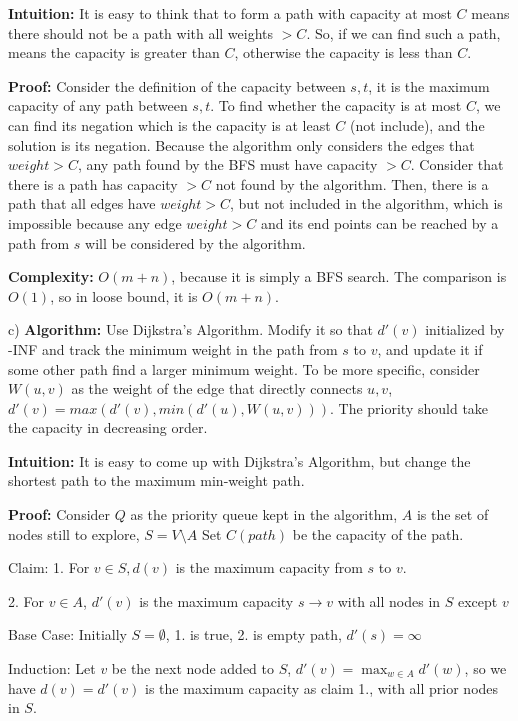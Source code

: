 \documentclass{article}
\begin{document}
\begin{enumerate}[topsep=0pt]
\textbf{Intuition:}
It is easy to think that to form a path with capacity at most $C$
means there should not be a path with all weights $>C$.
So, if we can find such a path, means the capacity is greater than $C$, 
otherwise the capacity is less than $C$. 

\textbf{Proof:}
Consider the definition of the capacity between $s,t$, it is the maximum capacity of any path between $s,t$.
To find whether the capacity is at most $C$, we can find its negation which is the capacity is at least $C$ (not include), and the solution is its negation.
Because the algorithm only considers the edges that $weight>C$, any path found by the BFS must have capacity $>C$.
Consider that there is a path has capacity $>C$ not found by the algorithm. Then, there is a path that all edges have $weight>C$, but not included in the algorithm,
which is impossible because any edge $weight>C$ and its end points can be reached by a path from $s$ will be considered by the algorithm.

\textbf{Complexity:}
$O(m+n)$, because it is simply a BFS search. The comparison is $O(1)$, 
so in loose bound, it is $O(m+n)$.

c) \textbf{Algorithm:}
Use Dijkstra's Algorithm. Modify it so that $d'(v)$ initialized by -INF and track the minimum weight in the path from $s$ to $v$, 
and update it if some other path find a larger minimum weight. 
To be more specific, consider $W(u,v)$ as the weight of the edge that directly connects $u,v$, $d'(v)=max(d'(v),min(d'(u),W(u,v)))$.
The priority should take the capacity in decreasing order.

\textbf{Intuition:}
It is easy to come up with Dijkstra's Algorithm, but change the shortest path to the maximum min-weight path.

\textbf{Proof:} Consider $Q$ as the priority queue kept in the algorithm, $A$ is the set of nodes still to explore, $S=V\setminus A$
Set $C(path)$ be the capacity of the path.

Claim: 1. For $v\in S,d(v)$ is the maximum capacity from $s$ to $v$.

2. For $v\in A$, $d'(v)$ is the maximum capacity $s\rightarrow v$ with all nodes in $S$ except $v$

Base Case: Initially $S=\emptyset$, 1. is true, 2. is empty path, $d'(s)=\infty$

Induction:
Let $v$ be the next node added to $S$, $d'(v)=\max_{w\in A}d'(w)$, so 
we have $d(v)=d'(v)$ is the maximum capacity as claim 1., with all prior nodes in $S$.


\end{enumerate}
\end{document}
